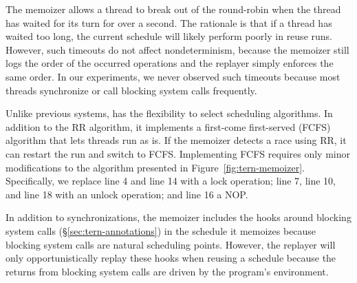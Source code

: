 The memoizer allows a thread to break out of the round-robin when the
thread has waited for its turn for over a second.  The rationale is that
if a thread has waited too long, the current schedule will likely
perform poorly in reuse runs.  However, such timeouts do not affect
nondeterminism, because the memoizer still logs the order of the occurred
operations and the replayer simply enforces the same order.  In our
experiments, we never observed such timeouts because most threads
synchronize or call blocking system calls frequently.

Unlike previous \dmt systems, \tern has the flexibility to select
scheduling algorithms.  In addition to the RR algorithm, it implements a
first-come first-served (FCFS) algorithm that lets threads run as is.  If
the memoizer detects a race using RR, it can restart the run and 
switch to FCFS.  Implementing
FCFS requires only minor modifications to the algorithm presented in
Figure~\ref{fig:tern-memoizer}. Specifically, we replace line 4 and line 14
with a lock operation; line 7, line 10, and line 18 with an unlock
operation; and line 16 a NOP.



In addition to synchronizations, the memoizer includes the hooks around
blocking system calls (\S\ref{sec:tern-annotations})
in the schedule it memoizes because blocking system calls are natural
scheduling points.  However, the replayer will only opportunistically
replay these hooks when reusing a schedule because the returns from
blocking system calls are driven by the program's environment.






